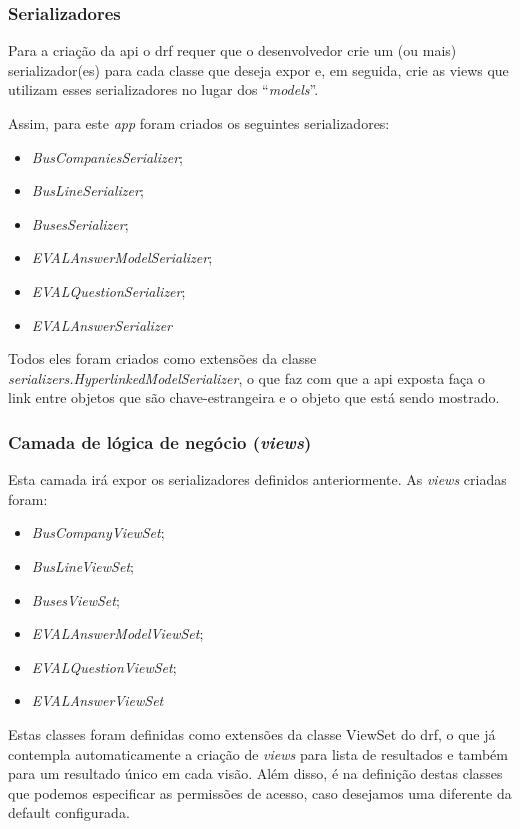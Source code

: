 \subsubsection{Serializadores}
Para a criação da \gls{api} o \gls{drf} requer que o desenvolvedor crie um (ou mais) serializador(es) para cada classe que deseja expor e, em seguida, crie as views que utilizam esses serializadores no lugar dos ``\textit{models}''.

Assim, para este \textit{app} foram criados os seguintes serializadores: %
\begin{itemize}
    \item \textit{BusCompaniesSerializer};
    \item \textit{BusLineSerializer};
    \item \textit{BusesSerializer};
    \item \textit{EVALAnswerModelSerializer};
    \item \textit{EVALQuestionSerializer};
    \item \textit{EVALAnswerSerializer}
\end{itemize}
Todos eles foram criados como extensões da classe \textit{serializers.HyperlinkedModelSerializer}, o que faz com que a \gls{api} exposta faça o link entre objetos que são chave-estrangeira e o objeto que está sendo mostrado.

\subsubsection{Camada de lógica de negócio (\textit{views})}\label{subsubsec:eval-camada-view}
Esta camada irá expor os serializadores definidos anteriormente. As \textit{views} criadas foram: %
\begin{itemize}
    \item \textit{BusCompanyViewSet};
    \item \textit{BusLineViewSet};
    \item \textit{BusesViewSet};
    \item \textit{EVALAnswerModelViewSet};
    \item \textit{EVALQuestionViewSet};
    \item \textit{EVALAnswerViewSet}
\end{itemize}
Estas classes foram definidas como extensões da classe ViewSet do \gls{drf}, o que já contempla automaticamente a criação de \textit{views} para lista de resultados e também para um resultado único em cada visão. Além disso, é na definição destas classes que podemos especificar as permissões de acesso, caso desejamos uma diferente da default configurada.

